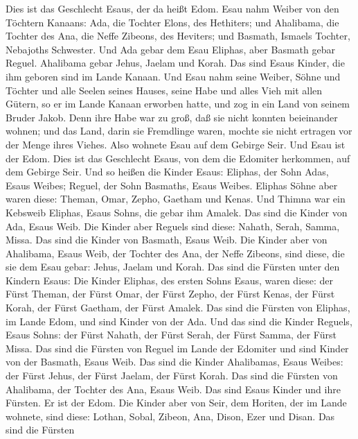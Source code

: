  Dies ist das Geschlecht Esaus, der da heißt Edom.
 Esau nahm Weiber von den Töchtern Kanaans: Ada, die Tochter
Elons, des Hethiters; und Ahalibama, die Tochter des Ana, die Neffe
Zibeons, des Heviters;  und Basmath, Ismaels Tochter,
Nebajoths Schwester.  Und Ada gebar dem Esau Eliphas, aber
Basmath gebar Reguel.  Ahalibama gebar Jehus, Jaelam und
Korah. Das sind Esaus Kinder, die ihm geboren sind im Lande Kanaan.
 Und Esau nahm seine Weiber, Söhne und Töchter und alle
Seelen seines Hauses, seine Habe und alles Vieh mit allen Gütern, so er
im Lande Kanaan erworben hatte, und zog in ein Land von seinem Bruder
Jakob.  Denn ihre Habe war zu groß, daß sie nicht konnten
beieinander wohnen; und das Land, darin sie Fremdlinge waren, mochte sie
nicht ertragen vor der Menge ihres Viehes.  Also wohnete
Esau auf dem Gebirge Seir. Und Esau ist der Edom.  Dies ist
das Geschlecht Esaus, von dem die Edomiter herkommen, auf dem Gebirge
Seir.  Und so heißen die Kinder Esaus: Eliphas, der Sohn
Adas, Esaus Weibes; Reguel, der Sohn Basmaths, Esaus Weibes.
 Eliphas Söhne aber waren diese: Theman, Omar, Zepho,
Gaetham und Kenas.  Und Thimna war ein Kebsweib Eliphas,
Esaus Sohns, die gebar ihm Amalek. Das sind die Kinder von Ada, Esaus
Weib.  Die Kinder aber Reguels sind diese: Nahath, Serah,
Samma, Missa. Das sind die Kinder von Basmath, Esaus Weib. 
Die Kinder aber von Ahalibama, Esaus Weib, der Tochter des Ana, der
Neffe Zibeons, sind diese, die sie dem Esau gebar: Jehus, Jaelam und
Korah.  Das sind die Fürsten unter den Kindern Esaus: Die
Kinder Eliphas, des ersten Sohns Esaus, waren diese: der Fürst Theman,
der Fürst Omar, der Fürst Zepho, der Fürst Kenas,  der
Fürst Korah, der Fürst Gaetham, der Fürst Amalek. Das sind die Fürsten
von Eliphas, im Lande Edom, und sind Kinder von der Ada. 
Und das sind die Kinder Reguels, Esaus Sohns: der Fürst Nahath, der
Fürst Serah, der Fürst Samma, der Fürst Missa. Das sind die Fürsten von
Reguel im Lande der Edomiter und sind Kinder von der Basmath, Esaus
Weib.  Das sind die Kinder Ahalibamas, Esaus Weibes: der
Fürst Jehus, der Fürst Jaelam, der Fürst Korah. Das sind die Fürsten von
Ahalibama, der Tochter des Ana, Esaus Weib.  Das sind Esaus
Kinder und ihre Fürsten. Er ist der Edom.  Die Kinder aber
von Seir, dem Horiten, der im Lande wohnete, sind diese: Lothan, Sobal,
Zibeon, Ana, Dison, Ezer und Disan.  Das sind die Fürsten
